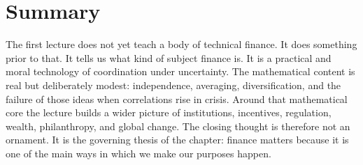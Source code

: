 \section{Summary}

The first lecture does not yet teach a body of technical finance. It does something prior to that. It tells us what kind of subject finance is. It is a practical and moral technology of coordination under uncertainty. The mathematical content is real but deliberately modest: independence, averaging, diversification, and the failure of those ideas when correlations rise in crisis. Around that mathematical core the lecture builds a wider picture of institutions, incentives, regulation, wealth, philanthropy, and global change. The closing thought is therefore not an ornament. It is the governing thesis of the chapter: finance matters because it is one of the main ways in which we make our purposes happen.